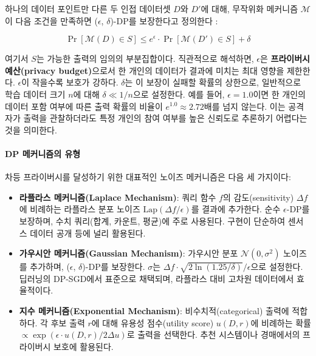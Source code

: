 하나의 데이터 포인트만 다른 두 인접 데이터셋 $D$와 $D'$에 대해, 무작위화 메커니즘 $\mathcal{M}$이 다음 조건을 만족하면 ($\epsilon$, $\delta$)-DP를 보장한다고 정의한다 \cite{dwork2014algorithmic}:

$$\Pr[\mathcal{M}(D) \in S] \leq e^{\epsilon} \cdot \Pr[\mathcal{M}(D') \in S] + \delta$$

여기서 $S$는 가능한 출력의 임의의 부분집합이다. 직관적으로 해석하면,
$\epsilon$은 \textbf{프라이버시 예산(privacy budget)}으로서
한 개인의 데이터가 결과에 미치는 최대 영향을 제한한다.
$\epsilon$이 작을수록 보호가 강하다.
$\delta$는 이 보장이 실패할 확률의 상한으로,
일반적으로 학습 데이터 크기 $n$에 대해 $\delta \ll 1/n$으로 설정한다.
예를 들어, $\epsilon = 1.0$이면 한 개인의 데이터 포함 여부에 따른
출력 확률의 비율이 $e^{1.0} \approx 2.72$배를 넘지 않는다.
이는 공격자가 출력을 관찰하더라도
특정 개인의 참여 여부를 높은 신뢰도로 추론하기 어렵다는 것을 의미한다.

\paragraph{DP 메커니즘의 유형}

차등 프라이버시를 달성하기 위한 대표적인 노이즈 메커니즘은 다음 세 가지이다:

\begin{itemize}
    \item \textbf{라플라스 메커니즘(Laplace Mechanism)}: 쿼리 함수 $f$의 감도(sensitivity) $\Delta f$에 비례하는 라플라스 분포 노이즈 $\text{Lap}(\Delta f / \epsilon)$를 결과에 추가한다. 순수 $\epsilon$-DP를 보장하며, 수치 쿼리(합계, 카운트, 평균)에 주로 사용된다. 구현이 단순하여 센서스 데이터 공개 등에 널리 활용된다.
    \item \textbf{가우시안 메커니즘(Gaussian Mechanism)}: 가우시안 분포 $\mathcal{N}(0, \sigma^2)$ 노이즈를 추가하며, ($\epsilon$, $\delta$)-DP를 보장한다. $\sigma$는 $\Delta f \cdot \sqrt{2 \ln(1.25/\delta)} / \epsilon$으로 설정한다. 딥러닝의 DP-SGD에서 표준으로 채택되며, 라플라스 대비 고차원 데이터에서 효율적이다.
    \item \textbf{지수 메커니즘(Exponential Mechanism)}: 비수치적(categorical) 출력에 적합하다. 각 후보 출력 $r$에 대해 유용성 점수(utility score) $u(D, r)$에 비례하는 확률 $\propto \exp(\epsilon \cdot u(D,r) / 2\Delta u)$로 출력을 선택한다. 추천 시스템이나 경매에서의 프라이버시 보호에 활용된다.
\end{itemize}


